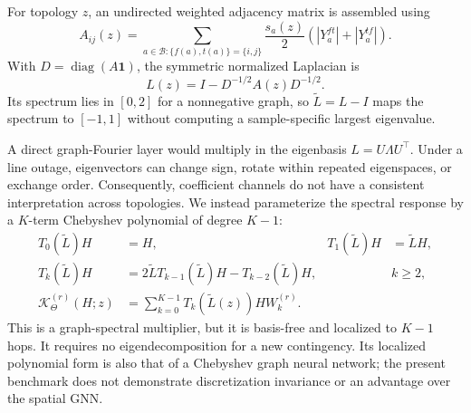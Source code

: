 \documentclass[final,5p,times,twocolumn]{elsarticle}
\newcommand{\Bset}{\mathcal{B}}
\newcommand{\diag}{\operatorname{diag}}
\begin{document}
For topology $z$, an undirected weighted adjacency matrix is assembled using
\begin{equation}
  A_{ij}(z)
  =
  \sum_{a\in\Bset:\{f(a),t(a)\}=\{i,j\}}
  \frac{s_a(z)}{2}
  \left(|Y_{a}^{ft}|+|Y_{a}^{tf}|\right).
  \label{eq:adjacency}
\end{equation}
With $D=\diag(A\mathbf{1})$, the symmetric normalized Laplacian is
\begin{equation}
  L(z)=I-D^{-1/2}A(z)D^{-1/2}.
  \label{eq:laplacian}
\end{equation}
Its spectrum lies in $[0,2]$ for a nonnegative graph, so
$\widetilde L=L-I$ maps the spectrum to $[-1,1]$ without computing a
sample-specific largest eigenvalue.

A direct graph-Fourier layer would multiply in the eigenbasis
$L=U\Lambda U^\top$. Under a line outage, eigenvectors can change sign,
rotate within repeated eigenspaces, or exchange order. Consequently,
coefficient channels do not have a consistent interpretation across
topologies. We instead parameterize the spectral response by a $K$-term
Chebyshev polynomial of degree $K-1$:
\begin{align}
  T_0(\widetilde L)H &= H,
  &
  T_1(\widetilde L)H &= \widetilde L H,
  \nonumber\\
  T_k(\widetilde L)H
  &=2\widetilde L T_{k-1}(\widetilde L)H
  -T_{k-2}(\widetilde L)H,
  &&k\geq2,
  \label{eq:chebyshev_recurrence}\\
  \mathcal{K}_{\Theta}^{(r)}(H;z)
  &=
  \sum_{k=0}^{K-1}
  T_k(\widetilde L(z))H W_k^{(r)}.
  \label{eq:chebyshev_filter}
\end{align}
This is a graph-spectral multiplier, but it is basis-free and localized to
$K-1$ hops. It requires no eigendecomposition for a new contingency. Its
localized polynomial form is also that of a Chebyshev graph neural network;
the present benchmark does not demonstrate discretization invariance or an
advantage over the spatial GNN.
\end{document}
